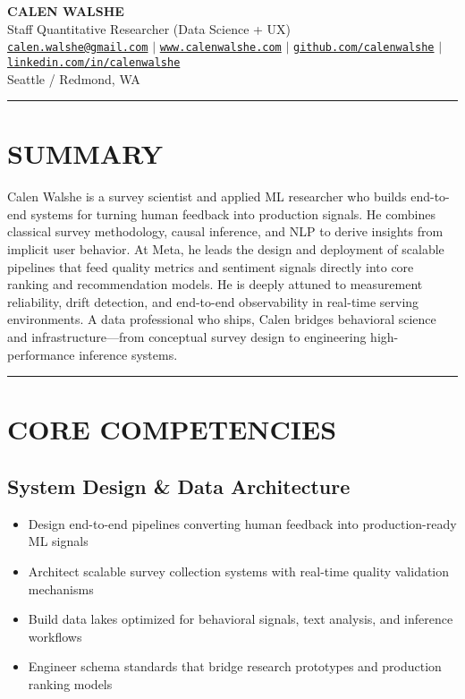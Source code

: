 \documentclass[11pt,a4paper]{article}
\newcommand{\sepline}{\noindent\rule{\textwidth}{0.5pt}\vspace{0.5em}}
\begin{document}
\begin{center}
    {\Huge\bfseries\color{darkblue} CALEN WALSHE}\\[0.3em]
    {\large Staff Quantitative Researcher (Data Science + UX)}\\[0.5em]

    \href{mailto:calen.walshe@gmail.com}{\texttt{calen.walshe@gmail.com}} $\mid$
    \href{https://www.calenwalshe.com}{\texttt{www.calenwalshe.com}} $\mid$
    \href{https://github.com/calenwalshe}{\texttt{github.com/calenwalshe}} $\mid$
    \href{https://linkedin.com/in/calenwalshe}{\texttt{linkedin.com/in/calenwalshe}}\\[0.2em]

    {\color{mediumgray} Seattle / Redmond, WA}
\end{center}

\vspace{0.5em}
\sepline

\section*{SUMMARY}
Calen Walshe is a survey scientist and applied ML researcher who builds end-to-end systems for turning human feedback into production signals. He combines classical survey methodology, causal inference, and NLP to derive insights from implicit user behavior. At Meta, he leads the design and deployment of scalable pipelines that feed quality metrics and sentiment signals directly into core ranking and recommendation models. He is deeply attuned to measurement reliability, drift detection, and end-to-end observability in real-time serving environments. A data professional who ships, Calen bridges behavioral science and infrastructure—from conceptual survey design to engineering high-performance inference systems.

\vspace{0.5em}
\sepline

\section*{CORE COMPETENCIES}

\subsection*{System Design \& Data Architecture}
\begin{itemize}
    \item Design end-to-end pipelines converting human feedback into production-ready ML signals
    \item Architect scalable survey collection systems with real-time quality validation mechanisms
    \item Build data lakes optimized for behavioral signals, text analysis, and inference workflows
    \item Engineer schema standards that bridge research prototypes and production ranking models
\end{itemize}
\end{document}

